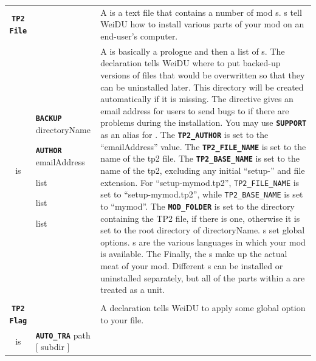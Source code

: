 \documentclass{article}
\def\ttref#1{\ahrefloc{#1}{\tt #1}}
\def\DEFINE#1{{\tt \bf #1}\label{#1}\index{#1}}
\def\t#1{{\tt #1}}
\def\Slist{{\color{red} list }}
\def\Ob{{\color{red} [ }}
\def\Oe{{\color{red} ] }}
\begin{document}
\begin{tabular}{cp{10in}|p{10in}}

\DEFINE{TP2 File} & &
  A \ttref{TP2 File} is a text file that contains a number of
  mod \ttref{Component}s. \ttref{TP2 File}s tell WeiDU how to install
  various parts of your mod on an end-user's computer. \\

  is & \DEFINE{BACKUP} directoryName

       \DEFINE{AUTHOR} emailAddress

       \ttref{TP2 Flag} \Slist

       \ttref{Language} \Slist

       \ttref{Component} \Slist &

       A \ttref{TP2 File} is basically a prologue and then a list of
       \ttref{Component}s. The \ttref{BACKUP} declaration tells WeiDU
       where to put backed-up versions of files that would be
       overwritten so that they can be uninstalled later. This
       directory will be created automatically if it is missing. The
       \ttref{AUTHOR} directive gives an email address for users to
       send bugs to if there are problems during the installation. You
       may use \DEFINE{SUPPORT} as an alias for \ttref{AUTHOR}. The
       \DEFINE{TP2_AUTHOR} \ttref{variable} is set to the
       ``emailAddress'' value. The \DEFINE{TP2_FILE_NAME}
       \ttref{variable} is set to the name of the tp2 file. The
       \DEFINE{TP2_BASE_NAME} \ttref{variable} is set to the name of
       the tp2, excluding any initial ``setup-'' and file
       extension. For ``setup-mymod.tp2'', \t{TP2_FILE_NAME} is set to
       ``setup-mymod.tp2'', while \t{TP2_BASE_NAME} is set to
       ``mymod''.  The \DEFINE{MOD_FOLDER} \ttref{variable} is set to
       the directory containing the TP2 file, if there is one,
       otherwise it is set to the root directory of directoryName.
       \ttref{TP2 Flag}s set global options.  \ttref{Language}s are
       the various languages in which your mod is available. The
       Finally, the \ttref{Component}s make up the actual meat of your
       mod. Different \ttref{Component}s can be installed or
       uninstalled separately, but all of the parts within a
       \ttref{Component} are treated as a unit.  \\

  \\

\DEFINE{TP2 Flag} & & A \ttref{TP2 Flag} declaration tells WeiDU to apply some
global option to your \ttref{TP2} file. \\
  is & \DEFINE{AUTO_TRA} path \Ob subdir \Oe &


\end{tabular}
\end{document}
